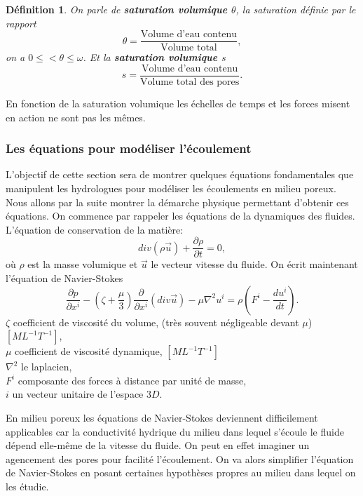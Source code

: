 \documentclass[a4paper,11pt]{article}
\numberwithin{equation}{section}
\newtheorem{definition}{Définition}
\begin{document}
\begin{definition}
	\label{def:saturation}
	On parle de \textbf{saturation volumique $\theta$}, la saturation définie par le rapport
	\begin{equation}
		\theta= \frac{\textrm{Volume d'eau contenu}}{\textrm{Volume total}},
	\end{equation}
	on a $0\leq<\theta\leq \omega$. Et la \textbf{saturation volumique $s$}
	\begin{equation}
		s=\frac{\textrm{Volume d'eau contenu}}{\textrm{Volume total des pores}}.
	\end{equation}
\end{definition}

En fonction de la saturation volumique les échelles de temps et les forces misent en action ne sont pas les mêmes.


\subsubsection{Les équations pour modéliser l'écoulement}
\label{ch: eq meca-flu}
L'objectif de cette section sera de montrer quelques équations fondamentales que manipulent les hydrologues pour modéliser les écoulements en milieu poreux. Nous allons par la suite montrer la démarche physique permettant d'obtenir ces équations. On commence par rappeler les équations de la dynamiques des fluides. L'équation de conservation de la matière:
\begin{equation}
	\label{cons-mat}
	div(\rho \overrightarrow{u})+\frac{\partial \rho}{\partial t}=0,
\end{equation}
où $\rho$ est la masse volumique et $\overrightarrow{u}$ le vecteur vitesse du fluide. On écrit maintenant l'équation de Navier-Stokes
\begin{equation}
	\frac{\partial p}{\partial x^i}-(\zeta+\frac{\mu}{3})\frac{\partial}{\partial x^i}(div\overrightarrow{u}) - \mu \nabla^2u^i=\rho(F^i -\frac{du^i}{dt}).
\end{equation}
$\zeta$ coefficient de viscosité du volume, (très souvent négligeable devant $\mu$) $[ML^{-1}T^{-1}]$,\\
$\mu$ coefficient de viscosité dynamique, $[ML^{-1}T^{-1}]$\\
$\nabla^2$ le laplacien,\\
$F^i$ composante des forces à distance par unité de masse,\\
$i$ un vecteur unitaire de l'espace $3D$.

En milieu poreux les équations de Navier-Stokes deviennent difficilement applicables car la conductivité hydrique du milieu dans lequel s'écoule le fluide dépend elle-même de la vitesse du fluide. On peut en effet imaginer un agencement des pores pour facilité l'écoulement. On va alors simplifier l'équation de Navier-Stokes en posant certaines hypothèses propres au milieu dans lequel on les étudie. 
\end{document}
